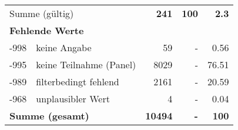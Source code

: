 \begin{longtable}{lXrrr}
     \midrule
     \multicolumn{2}{l}{Summe (gültig)} &
       \textbf{\num{241}} &
     \textbf{\num{100}} &
       \textbf{\num[round-mode=places,round-precision=2]{2.3}} \\
     \multicolumn{5}{l}{\textbf{Fehlende Werte}}\\
       -998 &
       keine Angabe &
         \num{59} &
        - &
         \num[round-mode=places,round-precision=2]{0.56} \\
       -995 &
       keine Teilnahme (Panel) &
         \num{8029} &
        - &
         \num[round-mode=places,round-precision=2]{76.51} \\
       -989 &
       filterbedingt fehlend &
         \num{2161} &
        - &
         \num[round-mode=places,round-precision=2]{20.59} \\
       -968 &
       unplausibler Wert &
         \num{4} &
        - &
         \num[round-mode=places,round-precision=2]{0.04} \\
     \midrule
     \multicolumn{2}{l}{\textbf{Summe (gesamt)}} &
          \textbf{\num{10494}} &
        \textbf{-} &
        \textbf{\num{100}} \\
     \bottomrule
     \end{longtable}
     
